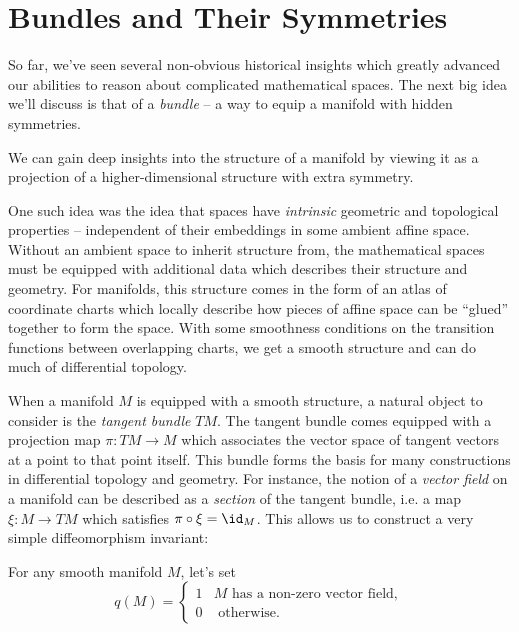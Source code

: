 \chapter{Bundles and Their Symmetries}\label{chapter:bundles_symmetries}

So far, we've seen several non-obvious historical insights which greatly advanced our abilities to reason about complicated mathematical spaces. The next big idea we'll discuss is that of a \emph{bundle} -- a way to equip a manifold with hidden symmetries.

\begin{insight}
  We can gain deep insights into the structure of a manifold by viewing it as a projection of a higher-dimensional structure with extra symmetry.
\end{insight}


One such idea was the idea that spaces have \emph{intrinsic} geometric and topological properties -- independent of their embeddings in some ambient affine space. Without an ambient space to inherit structure from, the mathematical spaces must be equipped with additional data which describes their structure and geometry. 
For manifolds, this structure comes in the form of an atlas of coordinate charts which locally describe how pieces of affine space can be ``glued'' together to form the space. With some smoothness conditions on the transition functions between overlapping charts, we get a smooth structure and can do much of differential topology.
\vspace{1em}

When a manifold $M$ is equipped with a smooth structure, a natural object to consider is the \emph{tangent bundle} $TM$. The tangent bundle comes equipped with a projection map $\pi : TM \to M$ which associates the vector space of tangent vectors at a point to that point itself. This bundle forms the basis for many constructions in differential topology and geometry. For instance, the notion of a \emph{vector field} on a manifold can be described as a \emph{section} of the tangent bundle, i.e. a map $\xi : M \to TM$ which satisfies $\pi \circ \xi = \id_M$. This allows us to construct a very simple diffeomorphism invariant:

\begin{definition}
For any smooth manifold $M$, let's set 
\[
  q(M) = \begin{cases}1 & M\textrm{ has a non-zero vector field},\\ 0 & \textrm{ otherwise.}\end{cases}
\]
\end{definition}

